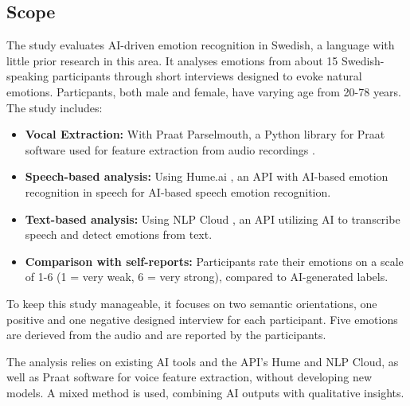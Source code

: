 \subsection{Scope}
The study evaluates AI-driven emotion recognition in Swedish, a language with little prior research in this area. It analyses emotions from about 15 Swedish-speaking participants through short interviews designed to evoke natural emotions. 
Particpants, both male and female, have varying age from 20-78 years. 
The study includes: 
\begin{itemize}
    \item \textbf{Vocal Extraction: } With Praat Parselmouth, a Python library for Praat software used for feature extraction from audio recordings \autocite{Jadoul2018}. 
    \item \textbf{Speech-based analysis:} Using Hume.ai \autocite{HumeAI-AboutHume}, an API with AI-based emotion recognition in speech for AI-based speech emotion recognition. 
    \item \textbf{Text-based analysis:} Using NLP Cloud \autocite{NLPCloud}, an API utilizing AI to transcribe speech and detect emotions from text.
    \item \textbf{Comparison with self-reports:} Participants rate their emotions on a scale of 1-6 (1 = very weak, 6 = very strong), compared to AI-generated labels. 
\end{itemize}
To keep this study manageable, it focuses on two semantic orientations, one positive and one negative designed interview for each participant. Five emotions are derieved from the audio and are reported by the participants.

The analysis relies on existing AI tools and the API's Hume and NLP Cloud, as well as Praat software for voice feature extraction, without developing new models. A mixed method is used, combining AI outputs with qualitative insights.

